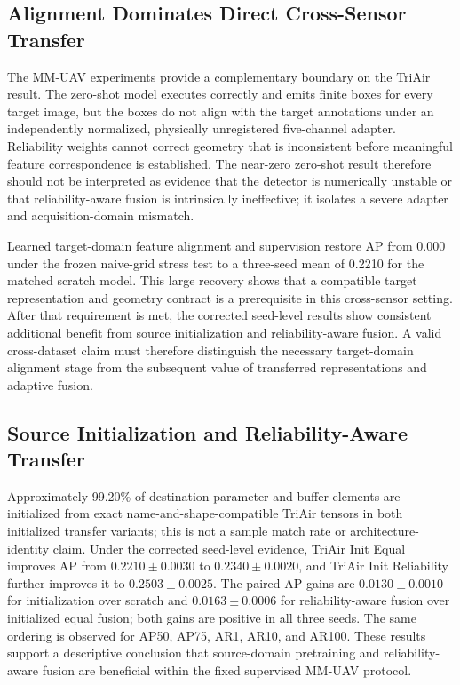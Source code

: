 \subsection{Alignment Dominates Direct Cross-Sensor Transfer}
The MM-UAV experiments provide a complementary boundary on the TriAir result. The zero-shot model executes correctly and emits finite boxes for every target image, but the boxes do not align with the target annotations under an independently normalized, physically unregistered five-channel adapter. Reliability weights cannot correct geometry that is inconsistent before meaningful feature correspondence is established. The near-zero zero-shot result therefore should not be interpreted as evidence that the detector is numerically unstable or that reliability-aware fusion is intrinsically ineffective; it isolates a severe adapter and acquisition-domain mismatch.

Learned target-domain feature alignment and supervision restore AP from 0.000 under the frozen naive-grid stress test to a three-seed mean of 0.2210 for the matched scratch model. This large recovery shows that a compatible target representation and geometry contract is a prerequisite in this cross-sensor setting. After that requirement is met, the corrected seed-level results show consistent additional benefit from source initialization and reliability-aware fusion. A valid cross-dataset claim must therefore distinguish the necessary target-domain alignment stage from the subsequent value of transferred representations and adaptive fusion.

\subsection{Source Initialization and Reliability-Aware Transfer}
Approximately 99.20\% of destination parameter and buffer elements are initialized from exact name-and-shape-compatible TriAir tensors in both initialized transfer variants; this is not a sample match rate or architecture-identity claim. Under the corrected seed-level evidence, TriAir Init Equal improves AP from $0.2210\pm0.0030$ to $0.2340\pm0.0020$, and TriAir Init Reliability further improves it to $0.2503\pm0.0025$. The paired AP gains are $0.0130\pm0.0010$ for initialization over scratch and $0.0163\pm0.0006$ for reliability-aware fusion over initialized equal fusion; both gains are positive in all three seeds. The same ordering is observed for AP50, AP75, AR1, AR10, and AR100. These results support a descriptive conclusion that source-domain pretraining and reliability-aware fusion are beneficial within the fixed supervised MM-UAV protocol.

